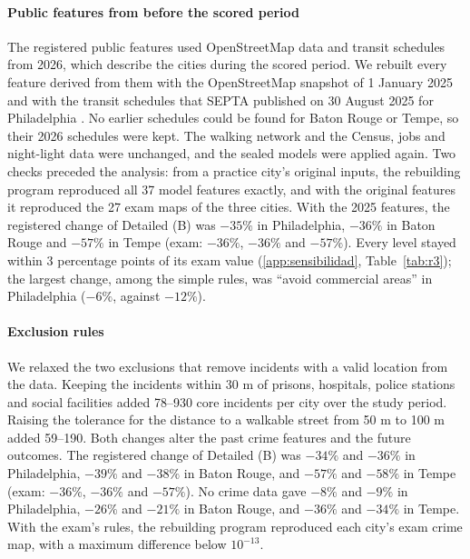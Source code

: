 \documentclass[preprint,12pt,authoryear]{elsarticle}
\begin{document}
\paragraph{Public features from before the scored period} The registered public features used OpenStreetMap data and transit schedules from 2026, which describe the cities during the scored period. We rebuilt every feature derived from them with the OpenStreetMap snapshot of 1 January 2025 \citep{osm_geofabrik} and with the transit schedules that SEPTA published on 30 August 2025 for Philadelphia \citep{septa_gtfs}. No earlier schedules could be found for Baton Rouge or Tempe, so their 2026 schedules were kept. The walking network and the Census, jobs and night-light data were unchanged, and the sealed models were applied again. Two checks preceded the analysis: from a practice city's original inputs, the rebuilding program reproduced all 37 model features exactly, and with the original features it reproduced the 27 exam maps of the three cities. With the 2025 features, the registered change of Detailed (B) was $-35\%$ in Philadelphia, $-36\%$ in Baton Rouge and $-57\%$ in Tempe (exam: $-36\%$, $-36\%$ and $-57\%$). Every level stayed within 3 percentage points of its exam value (\ref{app:sensibilidad}, Table~\ref{tab:r3}); the largest change, among the simple rules, was ``avoid commercial areas'' in Philadelphia ($-6\%$, against $-12\%$).

\paragraph{Exclusion rules} We relaxed the two exclusions that remove incidents with a valid location from the data. Keeping the incidents within 30 m of prisons, hospitals, police stations and social facilities added 78--930 core incidents per city over the study period. Raising the tolerance for the distance to a walkable street from 50 m to 100 m added 59--190. Both changes alter the past crime features and the future outcomes. The registered change of Detailed (B) was $-34\%$ and $-36\%$ in Philadelphia, $-39\%$ and $-38\%$ in Baton Rouge, and $-57\%$ and $-58\%$ in Tempe (exam: $-36\%$, $-36\%$ and $-57\%$). No crime data gave $-8\%$ and $-9\%$ in Philadelphia, $-26\%$ and $-21\%$ in Baton Rouge, and $-36\%$ and $-34\%$ in Tempe. With the exam's rules, the rebuilding program reproduced each city's exam crime map, with a maximum difference below $10^{-13}$.

\end{document}
